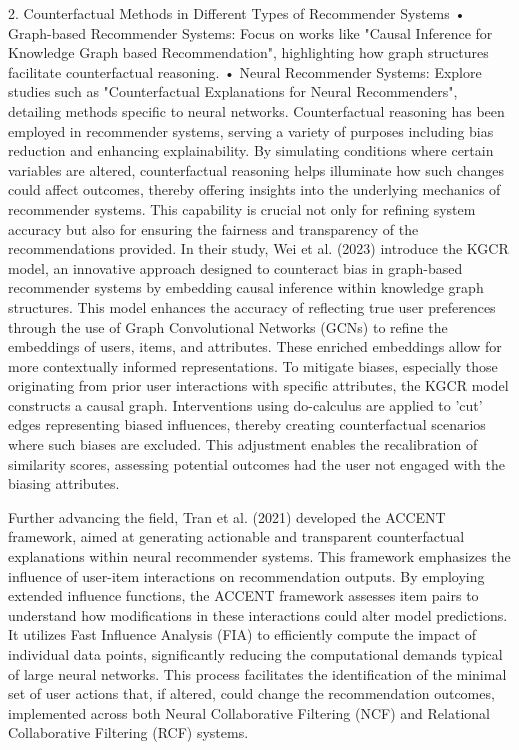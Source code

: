 2. Counterfactual Methods in Different Types of Recommender Systems
•	Graph-based Recommender Systems: Focus on works like "Causal Inference for Knowledge Graph based Recommendation", highlighting how graph structures facilitate counterfactual reasoning.
•	Neural Recommender Systems: Explore studies such as "Counterfactual Explanations for Neural Recommenders", detailing methods specific to neural networks.
Counterfactual reasoning has been employed in recommender systems, serving a variety of purposes including bias reduction and enhancing explainability. By simulating conditions where certain variables are altered, counterfactual reasoning helps illuminate how such changes could affect outcomes, thereby offering insights into the underlying mechanics of recommender systems. This capability is crucial not only for refining system accuracy but also for ensuring the fairness and transparency of the recommendations provided.
In their study, Wei et al. (2023) introduce the KGCR model, an innovative approach designed to counteract bias in graph-based recommender systems by embedding causal inference within knowledge graph structures. This model enhances the accuracy of reflecting true user preferences through the use of Graph Convolutional Networks (GCNs) to refine the embeddings of users, items, and attributes. These enriched embeddings allow for more contextually informed representations. To mitigate biases, especially those originating from prior user interactions with specific attributes, the KGCR model constructs a causal graph. Interventions using do-calculus are applied to 'cut' edges representing biased influences, thereby creating counterfactual scenarios where such biases are excluded. This adjustment enables the recalibration of similarity scores, assessing potential outcomes had the user not engaged with the biasing attributes.

Further advancing the field, Tran et al. (2021) developed the ACCENT framework, aimed at generating actionable and transparent counterfactual explanations within neural recommender systems. This framework emphasizes the influence of user-item interactions on recommendation outputs. By employing extended influence functions, the ACCENT framework assesses item pairs to understand how modifications in these interactions could alter model predictions. It utilizes Fast Influence Analysis (FIA) to efficiently compute the impact of individual data points, significantly reducing the computational demands typical of large neural networks. This process facilitates the identification of the minimal set of user actions that, if altered, could change the recommendation outcomes, implemented across both Neural Collaborative Filtering (NCF) and Relational Collaborative Filtering (RCF) systems.

